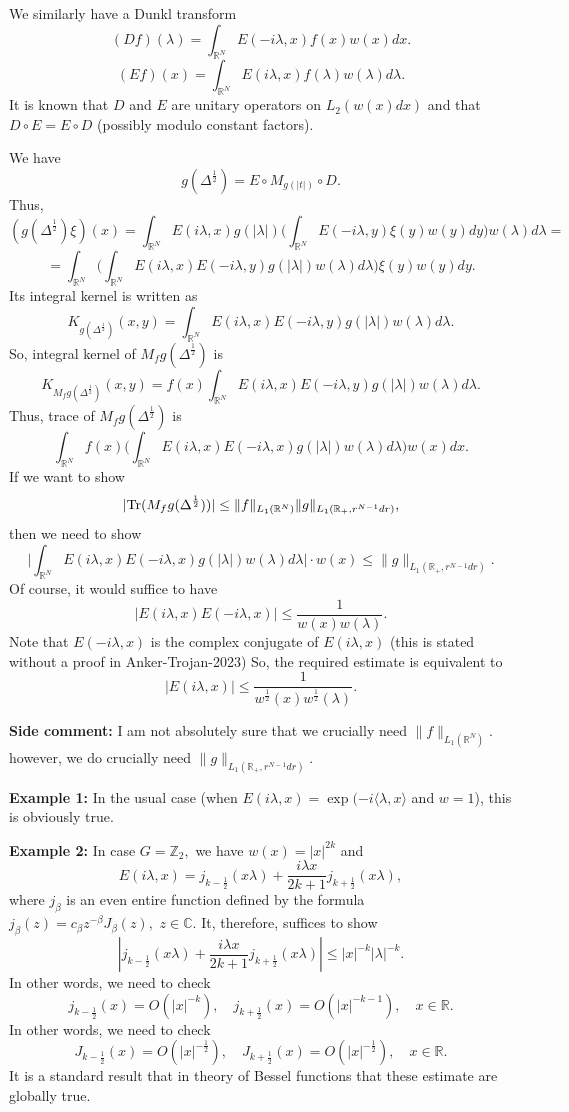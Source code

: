 \documentclass{amsart}
\begin{document}
We similarly have a Dunkl transform
$$(Df)(\lambda)=\int_{\mathbb{R}^N}E(-i\lambda,x)f(x)w(x)dx.$$
$$(Ef)(x)=\int_{\mathbb{R}^N}E(i\lambda,x)f(\lambda)w(\lambda)d\lambda.$$
It is known that $D$ and $E$ are unitary operators on $L_2(w(x)dx)$ and that $D\circ E=E\circ D$ (possibly modulo constant factors).

We have
$$g(\Delta^{\frac12})=E\circ M_{g(|t|)}\circ D.$$
Thus,
$$(g(\Delta^{\frac12})\xi)(x)=\int_{\mathbb{R}^N}E(i\lambda,x)g(|\lambda|)\Big(\int_{\mathbb{R}^N}E(-i\lambda,y)\xi(y)w(y)dy\Big)w(\lambda)d\lambda=$$
$$=\int_{\mathbb{R}^N}\Big(\int_{\mathbb{R}^N}E(i\lambda,x)E(-i\lambda,y)g(|\lambda|)w(\lambda)d\lambda\Big)\xi(y)w(y)dy.$$
Its integral kernel is written as
$$K_{g(\Delta^{\frac12})}(x,y)=\int_{\mathbb{R}^N}E(i\lambda,x)E(-i\lambda,y)g(|\lambda|)w(\lambda)d\lambda.$$
So, integral kernel of $M_fg(\Delta^{\frac12})$ is
$$K_{M_fg(\Delta^{\frac12})}(x,y)=f(x)\int_{\mathbb{R}^N}E(i\lambda,x)E(-i\lambda,y)g(|\lambda|)w(\lambda)d\lambda.$$
Thus, trace of $M_fg(\Delta^{\frac12})$ is
$$\int_{\mathbb{R}^N}f(x)\Big(\int_{\mathbb{R}^N}E(i\lambda,x)E(-i\lambda,x)g(|\lambda|)w(\lambda)d\lambda\Big)w(x)dx.$$
If we want to show
$$|{\rm Tr}(M_fg(\Delta^{\frac12}))|\leq \|f\|_{L_1(\mathbb{R}^N)}\|g\|_{L_1(\mathbb{R}_+,r^{N-1}dr)},$$
then we need to show
$$\Big|\int_{\mathbb{R}^N}E(i\lambda,x)E(-i\lambda,x)g(|\lambda|)w(\lambda)d\lambda\Big|\cdot w(x)\leq \|g\|_{L_1(\mathbb{R}_+,r^{N-1}dr)}.$$
Of course, it would suffice to have
$$|E(i\lambda,x)E(-i\lambda,x)|\leq \frac1{w(x)w(\lambda)}.$$
Note that $E(-i\lambda,x)$ is the complex conjugate of $E(i\lambda,x)$ (this is stated without a proof in Anker-Trojan-2023) So, the required estimate is equivalent to
$$|E(i\lambda,x)|\leq \frac1{w^{\frac12}(x)w^{\frac12}(\lambda)}.$$


{\bf Side comment:} I am not absolutely sure that we crucially need $\|f\|_{L_1(\mathbb{R}^N)}.$ however, we do crucially need $\|g\|_{L_1(\mathbb{R}_+,r^{N-1}dr)}.$


{\bf Example 1:} In the usual case (when $E(i\lambda,x)=\exp(-i\langle \lambda,x\rangle$ and $w=1$), this is obviously true.

{\bf Example 2:} In case $G=\mathbb{Z}_2,$ we have $w(x)=|x|^{2k}$ and
$$E(i\lambda,x)=j_{k-\frac12}(x\lambda)+\frac{i\lambda x}{2k+1}j_{k+\frac12}(x\lambda),$$
where $j_{\beta}$ is an even entire function defined by the formula $j_{\beta}(z)=c_{\beta}z^{-\beta}J_{\beta}(z),$ $z\in\mathbb{C}.$ It, therefore, suffices to show
$$|j_{k-\frac12}(x\lambda)+\frac{i\lambda x}{2k+1}j_{k+\frac12}(x\lambda)|\leq |x|^{-k}|\lambda|^{-k}.$$
In other words, we need to check
$$j_{k-\frac12}(x)=O(|x|^{-k}),\quad j_{k+\frac12}(x)=O(|x|^{-k-1}),\quad x\in\mathbb{R}.$$
In other words, we need to check
$$J_{k-\frac12}(x)=O(|x|^{-\frac12}),\quad J_{k+\frac12}(x)=O(|x|^{-\frac12}),\quad x\in\mathbb{R}.$$
It is a standard result that in theory of Bessel functions that these estimate are globally true.
\end{document}
